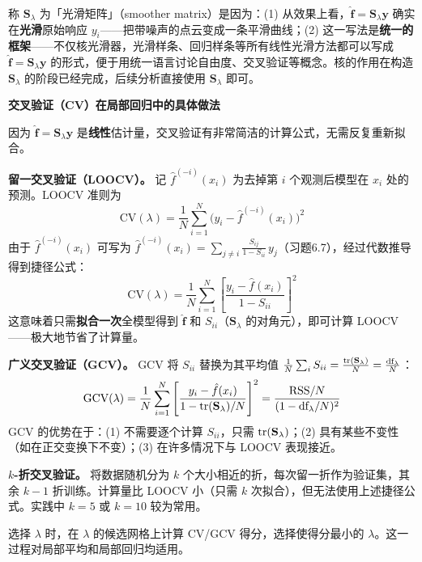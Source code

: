称 $\mathbf{S}_\lambda$ 为「光滑矩阵」（smoother matrix）是因为：(1) 从效果上看，$\hat{\mathbf{f}} = \mathbf{S}_\lambda \mathbf{y}$ 确实在\textbf{光滑}原始响应 $y_i$——把带噪声的点云变成一条平滑曲线；(2) 这一写法是\textbf{统一的框架}——不仅核光滑器，光滑样条、回归样条等所有线性光滑方法都可以写成 $\hat{\mathbf{f}} = \mathbf{S}_\lambda \mathbf{y}$ 的形式，便于用统一语言讨论自由度、交叉验证等概念。核的作用在构造 $\mathbf{S}_\lambda$ 的阶段已经完成，后续分析直接使用 $\mathbf{S}_\lambda$ 即可。

\medskip
\textbf{交叉验证（CV）在局部回归中的具体做法}

因为 $\hat{\mathbf{f}} = \mathbf{S}_\lambda \mathbf{y}$ 是\textbf{线性}估计量，交叉验证有非常简洁的计算公式，无需反复重新拟合。

\textbf{留一交叉验证（LOOCV）。} 记 $\hat{f}^{(-i)}(x_i)$ 为去掉第 $i$ 个观测后模型在 $x_i$ 处的预测。LOOCV 准则为
\[
\text{CV}(\lambda) = \frac{1}{N} \sum_{i=1}^{N} \bigl(y_i - \hat{f}^{(-i)}(x_i)\bigr)^2
\]
由于 $\hat{f}^{(-i)}(x_i)$ 可写为 $\hat{f}^{(-i)}(x_i) = \sum_{j \neq i} \frac{S_{ij}}{1 - S_{ii}} \, y_j$（习题6.7），经过代数推导得到捷径公式：
\begin{equation}\label{eq:loocv_shortcut}
    \text{CV}(\lambda) = \frac{1}{N} \sum_{i=1}^{N} \left[ \frac{y_i - \hat{f}(x_i)}{1 - S_{ii}} \right]^2
\end{equation}
这意味着只需\textbf{拟合一次}全模型得到 $\hat{\mathbf{f}}$ 和 $S_{ii}$（$\mathbf{S}_\lambda$ 的对角元），即可计算 LOOCV——极大地节省了计算量。

\textbf{广义交叉验证（GCV）。} GCV 将 $S_{ii}$ 替换为其平均值 $\frac{1}{N} \sum_i S_{ii} = \frac{\operatorname{tr}(\mathbf{S}_\lambda)}{N} = \frac{\text{df}_\lambda}{N}$：
\begin{equation}\label{eq:gcv}
    \text{GCV}(\lambda) = \frac{1}{N} \sum_{i=1}^{N} \left[ \frac{y_i - \hat{f}(x_i)}{1 - \operatorname{tr}(\mathbf{S}_\lambda)/N} \right]^2
    = \frac{\text{RSS}/N}{(1 - \text{df}_\lambda / N)^2}
\end{equation}
GCV 的优势在于：(1) 不需要逐个计算 $S_{ii}$，只需 $\operatorname{tr}(\mathbf{S}_\lambda)$；(2) 具有某些不变性（如在正交变换下不变）；(3) 在许多情况下与 LOOCV 表现接近。

\textbf{$k$-折交叉验证。} 将数据随机分为 $k$ 个大小相近的折，每次留一折作为验证集，其余 $k-1$ 折训练。计算量比 LOOCV 小（只需 $k$ 次拟合），但无法使用上述捷径公式。实践中 $k=5$ 或 $k=10$ 较为常用。

选择 $\lambda$ 时，在 $\lambda$ 的候选网格上计算 CV/GCV 得分，选择使得分最小的 $\lambda$。这一过程对局部平均和局部回归均适用。

